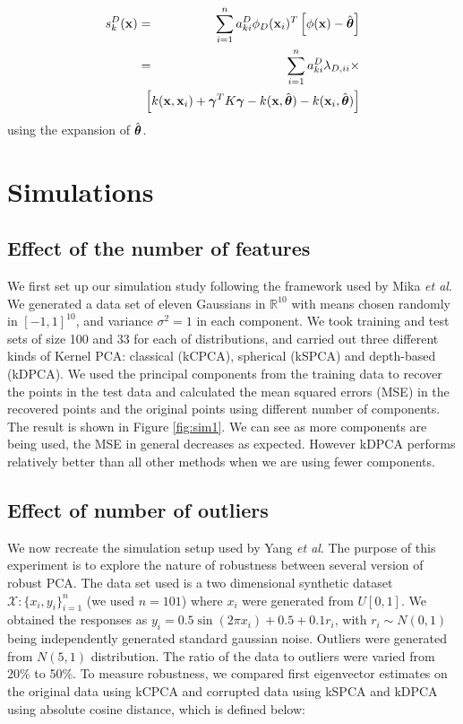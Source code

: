 \documentclass[10pt, conference, compsocconf]{IEEEtran}
\begin{document}
\begin{eqnarray}
s_k^D(\bfx) &=& \sum_{i=1}^n a^D_{ki} \phi_D(\bfx_i)^T \left[ \phi(\bfx) - \hat\bftheta \right]\notag\\
&=& \sum_{i=1}^n a^D_{ki} \lambda_{D,ii} \times \notag\\
&& \hspace{-.5cm} \left[ k(\bfx, \bfx_i) + \bfgamma^T K \bfgamma  - k(\bfx, \hat\bftheta) - k(\bfx_i, \hat\bftheta) \right]
\end{eqnarray}
using the expansion of $\hat{{\boldsymbol{\theta}}}$.

\section{Simulations}\label{section:sec4}
\subsection{Effect of the number of features}
We first set up our simulation study following the framework used by Mika \textit{et al}\cite{Mikaetal99}. We generated a data set of eleven Gaussians in $\mathbb{R}^{10}$ with means chosen randomly in $[-1,1]^{10}$, and variance $\sigma^2=1$ in each component. We took training and test sets of size 100 and 33 for each of distributions, and carried out three different kinds of Kernel PCA: classical (kCPCA), spherical (kSPCA) and depth-based (kDPCA). We used the principal components from the training data to recover the points in the test data and calculated the mean squared errors (MSE) in the recovered points and the original points using different number of components. The result is shown in Figure \ref{fig:sim1}. We can see as more components are being used, the MSE in general decreases as expected. However kDPCA performs relatively better than all other methods when we are using fewer components.

\subsection{Effect of number of outliers}
We now recreate the simulation setup used by Yang \textit{et al}\cite{Yangetal14}. The purpose of this experiment is to explore the nature of robustness between several version of robust PCA. The data set used is a two dimensional synthetic dataset $\mathcal{X}:\{x_i,y_i\}_{i=1}^n$ (we used $n=101$) where $x_i$ were generated from $U[0,1]$. We obtained the responses as $y_i = 0.5\sin(2\pi x_i)+0.5+0.1r_i$, with $r_i \sim N(0,1)$ being independently generated standard gaussian noise. Outliers were generated from $N(5,1)$ distribution. The ratio of the data to outliers were varied from 20\% to 50\%. To measure robustness, we compared first eigenvector estimates on the original data using kCPCA and corrupted data using kSPCA and kDPCA using absolute cosine distance, which is defined below:
\end{document}
